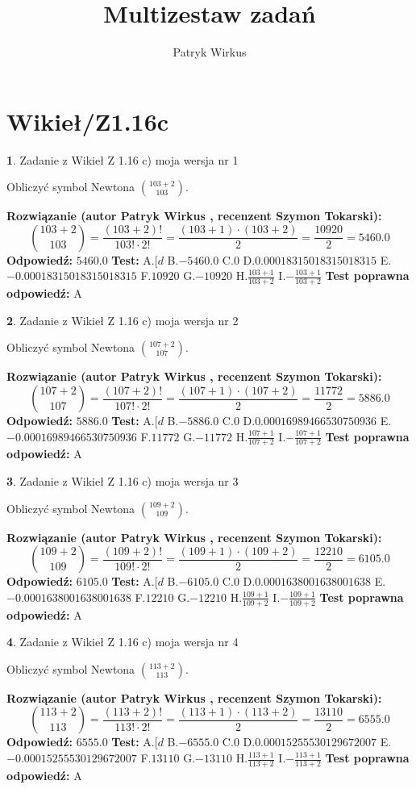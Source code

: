 \documentclass[12pt, a4paper]{article}
\title{Multizestaw zadań}
\author{Patryk Wirkus}
\date{}
\theoremstyle{definition} %
\newtheorem{zad}{}
\newcommand{\kategoria}[1]{\section{#1}}
\newcommand{\zadStart}[1]{\begin{zad}#1\newline}
\newcommand{\zadStop}{\end{zad}}
\newcommand{\rozwStart}[2]{\noindent \textbf{Rozwiązanie (autor #1 , recenzent #2): }\newline}
\newcommand{\rozwStop}{\newline}
\newcommand{\odpStart}{\noindent \textbf{Odpowiedź:}\newline}
\newcommand{\odpStop}{\newline}
\newcommand{\testStart}{\noindent \textbf{Test:}\newline}
\newcommand{\testStop}{\newline}
\newcommand{\kluczStart}{\noindent \textbf{Test poprawna odpowiedź:}\newline}
\newcommand{\kluczStop}{\newline}
\begin{document}
\maketitle

\kategoria{Wikieł/Z1.16c}


\zadStart{Zadanie z Wikieł Z 1.16 c) moja wersja nr 1}

Obliczyć symbol Newtona ${103+2 \choose 103}$.
\zadStop
\rozwStart{Patryk Wirkus}{Szymon Tokarski}
$${103+2 \choose 103} = \frac{(103+2)!}{103! \cdot 2!} = \frac{(103+1)\cdot(103+2)}{2} = \frac{10920}{2} = 5460.0$$
\rozwStop
\odpStart
$5460.0$
\odpStop
\testStart
A.$[d$ B.$-5460.0$ C.$0$ D.$0.00018315018315018315$ E.$-0.00018315018315018315$
F.$10920$ G.$-10920$
H.$\frac{103+1}{103+2}$
I.$-\frac{103+1}{103+2}$
\testStop
\kluczStart
A
\kluczStop



\zadStart{Zadanie z Wikieł Z 1.16 c) moja wersja nr 2}

Obliczyć symbol Newtona ${107+2 \choose 107}$.
\zadStop
\rozwStart{Patryk Wirkus}{Szymon Tokarski}
$${107+2 \choose 107} = \frac{(107+2)!}{107! \cdot 2!} = \frac{(107+1)\cdot(107+2)}{2} = \frac{11772}{2} = 5886.0$$
\rozwStop
\odpStart
$5886.0$
\odpStop
\testStart
A.$[d$ B.$-5886.0$ C.$0$ D.$0.00016989466530750936$ E.$-0.00016989466530750936$
F.$11772$ G.$-11772$
H.$\frac{107+1}{107+2}$
I.$-\frac{107+1}{107+2}$
\testStop
\kluczStart
A
\kluczStop



\zadStart{Zadanie z Wikieł Z 1.16 c) moja wersja nr 3}

Obliczyć symbol Newtona ${109+2 \choose 109}$.
\zadStop
\rozwStart{Patryk Wirkus}{Szymon Tokarski}
$${109+2 \choose 109} = \frac{(109+2)!}{109! \cdot 2!} = \frac{(109+1)\cdot(109+2)}{2} = \frac{12210}{2} = 6105.0$$
\rozwStop
\odpStart
$6105.0$
\odpStop
\testStart
A.$[d$ B.$-6105.0$ C.$0$ D.$0.0001638001638001638$ E.$-0.0001638001638001638$
F.$12210$ G.$-12210$
H.$\frac{109+1}{109+2}$
I.$-\frac{109+1}{109+2}$
\testStop
\kluczStart
A
\kluczStop



\zadStart{Zadanie z Wikieł Z 1.16 c) moja wersja nr 4}

Obliczyć symbol Newtona ${113+2 \choose 113}$.
\zadStop
\rozwStart{Patryk Wirkus}{Szymon Tokarski}
$${113+2 \choose 113} = \frac{(113+2)!}{113! \cdot 2!} = \frac{(113+1)\cdot(113+2)}{2} = \frac{13110}{2} = 6555.0$$
\rozwStop
\odpStart
$6555.0$
\odpStop
\testStart
A.$[d$ B.$-6555.0$ C.$0$ D.$0.00015255530129672007$ E.$-0.00015255530129672007$
F.$13110$ G.$-13110$
H.$\frac{113+1}{113+2}$
I.$-\frac{113+1}{113+2}$
\testStop
\kluczStart
A
\kluczStop
\end{document}
